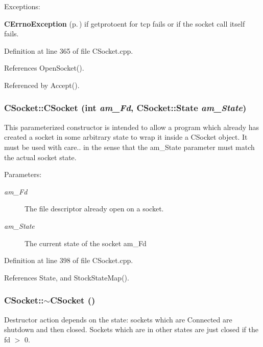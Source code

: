Exceptions:

\begin{CompactItemize}
\item 
{\bf CErrno\-Exception} {\rm (p.\,\pageref{classCErrnoException})} if getprotoent for tcp fails or if the socket call itself fails. \end{CompactItemize}


Definition at line 365 of file CSocket.cpp.

References Open\-Socket().

Referenced by Accept().
\subsubsection{\setlength{\rightskip}{0pt plus 5cm}CSocket::CSocket (int {\em am\_\-Fd}, {\bf CSocket::State} {\em am\_\-State})}\label{classCSocket_a1}


This parameterized constructor is intended to allow a program which already has created a socket in some arbitrary state to wrap it inside a CSocket object. It must be used with care.. in the sense that the am\_\-State parameter must match the actual socket state.\begin{Desc}
\item[Parameters: ]\par
\begin{description}
\item[{\em 
am\_\-Fd}]The file descriptor already open on a socket. \item[{\em 
am\_\-State}]The current state of the socket am\_\-Fd \end{description}
\end{Desc}


Definition at line 398 of file CSocket.cpp.

References State, and Stock\-State\-Map().
\subsubsection{\setlength{\rightskip}{0pt plus 5cm}CSocket::$\sim$CSocket ()\hspace{0.3cm}{\tt  [virtual]}}\label{classCSocket_a2}


Destructor action depends on the state: sockets which are Connected are shutdown and then closed. Sockets which are in other states are just closed if the fd $>$ 0. 

